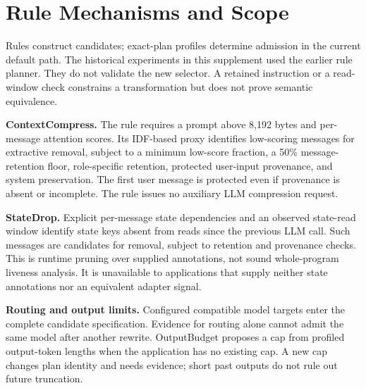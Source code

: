 


\printAffiliationsAndNotice{}
\appendix

\section{Rule Mechanisms and Scope}
\label{sec:rules}

Rules construct candidates; exact-plan profiles determine admission in the current
default path. The historical experiments in this supplement used the earlier rule
planner. They do not validate the new selector. A retained instruction or a read-window
check constrains a transformation but does not prove semantic equivalence.

\textbf{ContextCompress.} The rule requires a prompt above 8,192 bytes and per-message
attention scores. Its IDF-based proxy identifies low-scoring messages for extractive
removal, subject to a minimum low-score fraction, a 50\% message-retention floor,
role-specific retention, protected user-input provenance, and system preservation.
The first user message is protected even if provenance is absent or incomplete.
The rule issues no auxiliary LLM compression request.

\textbf{StateDrop.} Explicit per-message state dependencies and an observed state-read
window identify state keys absent from reads since the previous LLM call. Such
messages are candidates for removal, subject to retention and provenance checks.
This is runtime pruning over supplied annotations, not sound whole-program liveness
analysis. It is unavailable to applications that supply neither state annotations
nor an equivalent adapter signal.

\textbf{Routing and output limits.} Configured compatible model targets enter the
complete candidate specification. Evidence for routing alone cannot admit the same
model after another rewrite. OutputBudget proposes a cap from profiled output-token
lengths when the application has no existing cap. A new cap changes plan identity
and needs evidence; short past outputs do not rule out future truncation.

